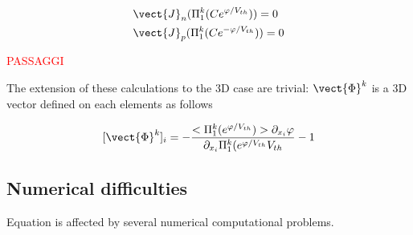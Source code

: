 \begin{align}
& \vect{J}_n(\Pi_1^k(Ce^{\varphi / V_{th}})) = 0 \\ 
& \vect{J}_p(\Pi_1^k(Ce^{-\varphi / V_{th}})) = 0
\end{align}



\textcolor{red}{PASSAGGI}


The extension of these calculations to the 3D case are trivial: $\vect{\Phi}^k$ is a 3D vector defined on each elements as follows

\begin{equation}
\label{eq: SG stabilized}
[\vect{\Phi}^k]_i = -\dfrac{<\Pi_1^k(e^{\varphi/V_{th}})> \partial_{x_i}\varphi}{\partial_{x_i}\Pi_1^k(e^{\varphi/V_{th}}V_{th}} -1 
\end{equation}

\subsection{Numerical difficulties}
Equation  is affected by several numerical computational problems.
